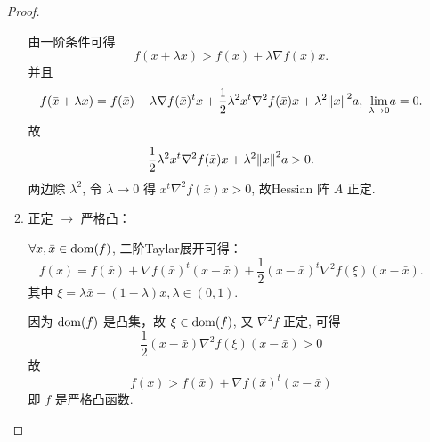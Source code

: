 \begin{Problem}
\begin{enumerate}
\begin{proof}
\begin{enumerate}
                由一阶条件可得 
                \[f(\bar{x} + \lambda x) > f(\bar{x}) + \lambda \nabla f(\bar{x})x.\] 
                并且
                \[f(\bar{x} + \lambda x) = f(\bar{x}) + \lambda \nabla f(\bar{x})^tx + \frac{1}{2}\lambda^2 x^t\nabla^2f(\bar{x})x + \lambda^2\norm{x}^2a,\ \underset{\lambda \to 0}{\lim} a = 0.\] 
                故 
                \[\frac{1}{2}\lambda^2 x^t\nabla^2f(\bar{x})x + \lambda^2\norm{x}^2a > 0.\] 
                两边除 $\lambda^2$, 令 $\lambda \to 0$ 得 $x^t\nabla^2f(\bar{x})x > 0$, 故Hessian 阵 $A$ 正定. 
                \item 正定 $\to$ 严格凸：
                
                $\forall x, \bar{x} \in \operatorname{dom}(f)$, 二阶Taylar展开可得：
                \[f(x) = f(\bar{x}) + \nabla f(\bar{x})^t(x - \bar{x}) + \frac{1}{2}(x - \bar{x})^t\nabla^2f(\xi)(x - \bar{x}).\]
                其中 $\xi = \lambda \bar{x} + (1 - \lambda)x, \lambda \in (0, 1).$

                因为 $\operatorname{dom}(f)$ 是凸集，故 $\xi \in \operatorname{dom}(f)$, 又 $\nabla^2f$ 正定, 可得 
                \[\frac{1}{2}(x - \bar{x})\nabla^2f(\xi)(x - \bar{x}) > 0\]
                故 
                \[f(x) > f(\bar{x}) + \nabla f(\bar{x})^t(x - \bar{x})\]
                即 $f$ 是严格凸函数.
            \end{enumerate}
        \end{proof}
    \end{enumerate}
\end{Problem}


